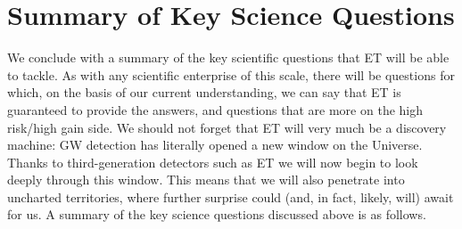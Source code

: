    

\section{Summary of Key Science Questions}\label{sect:ScienceCaseKeyQuestions}



We conclude with a summary of the key scientific questions that ET will be able to tackle. As with any scientific enterprise of this scale, there will be questions for which, on the basis of our current understanding, we can say that ET is guaranteed to provide the answers, and questions that are more on the high risk/high gain side. We should not forget that ET will very much be a discovery machine: GW detection has literally opened a new window on the Universe. Thanks to third-generation detectors such as  ET we will now begin to look deeply  through this window. This means that we will  also penetrate  into uncharted territories, where further surprise could (and, in fact, likely, will) await for us.
A summary of the key science questions discussed above is as follows.

\vspace{1mm}

